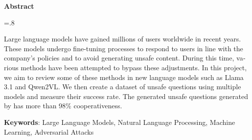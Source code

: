 

\begin{latin}

    \begin{center}
    \textbf{Abstract}
    \end{center}
    \baselineskip=.8\baselineskip
    
    Large language models have gained millions of users worldwide in recent years. These models undergo fine-tuning processes to respond to users in line with the company’s policies and to avoid generating unsafe content. During this time, various methods have been attempted to bypass these adjustments. In this project, we aim to review some of these methods in new language models such as Llama 3.1 and Qwen2VL.
    We then create a dataset of unsafe questions using multiple models and measure their success rate. The generated unsafe questions generated by  has more than 98\% cooperativeness.
    
    \bigskip\noindent\textbf{Keywords}:
    Large Language Models, Natural Language Processing, Machine Learning, Adversarial Attacks
    
    \end{latin}
    